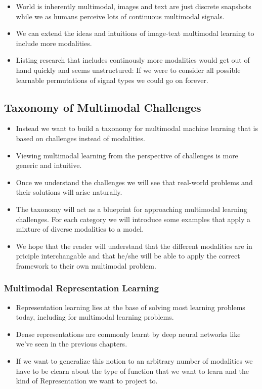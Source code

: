 \documentclass[
]{krantz}
\providecommand{\tightlist}{%
  \setlength{\itemsep}{0pt}\setlength{\parskip}{0pt}}
\begin{document}
\begin{itemize}
\tightlist
\item
  World is inherently multimodal, images and text are just discrete snapshots while we as humans perceive lots of continuous multimodal signals.
\item
  We can extend the ideas and intuitions of image-text multimodal learning to include more modalities.
\item
  Listing research that includes continously more modalities would get out of hand quickly and seems unstructured: If we were to consider all possible learnable permutations of signal types we could go on forever.
\end{itemize}

\hypertarget{taxonomy-of-multimodal-challenges}{%
\subsection{Taxonomy of Multimodal Challenges}\label{taxonomy-of-multimodal-challenges}}

\begin{itemize}
\tightlist
\item
  Instead we want to build a taxonomy for multimodal machine learning that is based on challenges instead of modalities.
\item
  Viewing multimodal learning from the perspective of challenges is more generic and intuitive.
\item
  Once we understand the challenges we will see that real-world problems and their solutions will arise naturally.
\item
  The taxonomy will act as a blueprint for approaching multimodal learning challenges. For each category we will introduce some examples that apply a mixture of diverse modalities to a model.
\item
  We hope that the reader will understand that the different modalities are in priciple interchangable and that he/she will be able to apply the correct framework to their own multimodal problem.
\end{itemize}

\hypertarget{multimodal-representation-learning}{%
\subsubsection{Multimodal Representation Learning}\label{multimodal-representation-learning}}

\begin{itemize}
\tightlist
\item
  Representation learning lies at the base of solving most learning problems today, including for multimodal learning problems.
\item
  Dense representations are commonly learnt by deep neural networks like we've seen in the previous chapters.
\item
  If we want to generalize this notion to an arbitrary number of modalities we have to be clearn about the type of function that we want to learn and the kind of Representation we want to project to.
\end{itemize}
\end{document}

